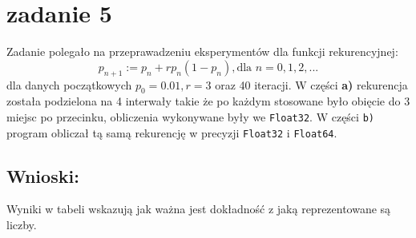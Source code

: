 \section{zadanie 5}
Zadanie polegało na przeprawadzeniu eksperymentów dla funkcji rekurencyjnej:
\[ p_{n+1} := p_n + rp_n(1-p_n), \textrm{dla } n = 0,1,2,...\]
dla danych początkowych \(p_0 = 0.01, r=3\) oraz 40 iteracji. 
W części \textbf{a)} rekurencja została podzielona na 4 interwały takie że po każdym stosowane było obięcie do 3 miejsc po przecinku, obliczenia wykonywane były we \texttt{Float32}. W części \texttt{b)} program obliczał tą samą rekurencję w precyzji \texttt{Float32} i \texttt{Float64}.
\subsection{Wnioski:}
Wyniki w tabeli wskazują jak ważna jest dokładność z jaką reprezentowane są liczby.
\begin{table}[ht]
    \caption{wartości z wyjścia programu \texttt{zadanie5.jl}}

\end{table}